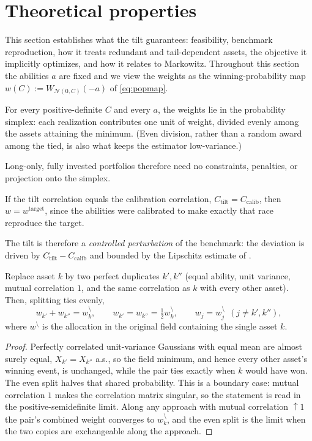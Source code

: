 \section{Theoretical properties}
\label{sec:properties}

This section establishes what the tilt guarantees: feasibility, benchmark
reproduction, how it treats redundant and tail-dependent assets, the objective
it implicitly optimizes, and how it relates to Markowitz.
Throughout this section the abilities $a$ are fixed and we view the
weights as the winning-probability map $w(C) := W_{\mathcal N(0,C)}(-a)$ of
\eqref{eq:popmap}.

\begin{remark}[Feasibility]
\label{rem:feasible}
For every positive-definite $C$ and every $a$, the weights lie in the
probability simplex: each realization contributes one unit of weight, divided
evenly among the assets attaining the minimum. (Even division, rather than a
random award among the tied, is also what keeps the estimator low-variance.)
\end{remark}
\noindent Long-only, fully invested portfolios therefore need no constraints,
penalties, or projection onto the simplex.

\begin{remark}
\label{rem:fixedpoint}
If the tilt correlation equals the calibration correlation,
$C_{\mathrm{tilt}} = C_{\mathrm{calib}}$, then $w = w^{\mathrm{target}}$, since the
abilities were calibrated to make exactly that race reproduce the target.
\end{remark}
\noindent The tilt is therefore a \emph{controlled perturbation} of the
benchmark: the deviation is driven by $C_{\mathrm{tilt}} - C_{\mathrm{calib}}$
and bounded by the Lipschitz estimate of .

\begin{lemma}
\label{lem:redundancy}
Replace asset $k$ by two perfect duplicates $k', k''$ (equal ability, unit
variance, mutual correlation $1$, and the same correlation as $k$ with every
other asset). Then, splitting ties evenly,
\begin{equation*}
  w_{k'} + w_{k''} = w_k^{\setminus}, \qquad
  w_{k'} = w_{k''} = \tfrac12 w_k^{\setminus}, \qquad
  w_j = w_j^{\setminus}\ \ (j \neq k', k''),
\end{equation*}
where $w^{\setminus}$ is the allocation in the original field containing the
single asset $k$.
\end{lemma}
\begin{proof}
Perfectly correlated unit-variance Gaussians with equal mean are almost surely
equal, $X_{k'} = X_{k''}$ a.s., so the field minimum, and hence every other
asset's winning event, is unchanged, while the pair ties exactly when $k$ would
have won. The even split halves that shared probability. This is a boundary case:
mutual correlation $1$ makes the correlation matrix singular, so the statement is
read in the positive-semidefinite limit. Along any approach with mutual
correlation $\uparrow 1$ the pair's combined weight converges to
$w_k^{\setminus}$, and the even split is the limit when the two copies are
exchangeable along the approach.
\end{proof}

